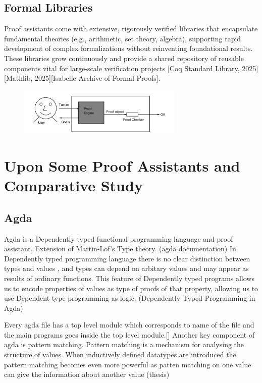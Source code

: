 \documentclass[12pt]{article}
\begin{document}
\subsection{Formal Libraries}
Proof assistants come with extensive, rigorously verified libraries that
encapsulate fundamental theories (e.g., arithmetic, set theory, algebra), supporting rapid development of
complex formalizations without reinventing foundational results.
These libraries grow continuously and provide a shared repository of reusable components vital for large-scale verification projects [Coq Standard Library, 2025][Mathlib, 2025][Isabelle Archive of Formal Proofs].


\begin{figure}[h!]
  \centering
  \includegraphics[width=0.7\textwidth]{fig/ui.png} 
  
\end{figure}
\cite{Geuvers20091}

\section{Upon Some Proof Assistants and Comparative Study}
\subsection{ Agda}
Agda  is a Dependently typed functional programming language and proof assistant. Extension of Martin-Lof's Type theory. (agda documentation) 
In Dependently typed programming language there is no clear distinction between types and values , and types can depend on arbitary values and may appear as results of ordinary functions. 
This feature of Dependently typed programs allows us to encode properties of values as type of proofs of that property, allowing us to use Dependent type programming as logic.  (Dependently Typed Programming in Agda) 

Every agda file has a top level module which corresponds to name of the file and the main programs goes inside the top level module.[]
Another key component of agda is pattern matching. Pattern matching is a mechanism for analysing the structure of values. When inductively defined  datatypes are introduced the
pattern matching becomes even more powerful as patten matching on one value can give the information about another value (thesis) 
\end{document}
